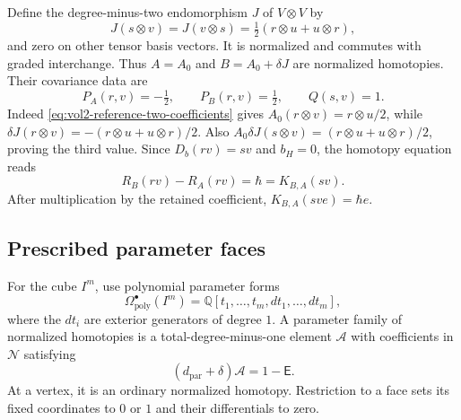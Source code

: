 Define the degree-minus-two endomorphism $J$ of
$V\otimes V$ by
\[
 J(s\otimes v)=J(v\otimes s)
                  =\tfrac12(r\otimes u+u\otimes r),
\]
and zero on other tensor basis vectors. It is normalized
and commutes with graded interchange. Thus
$A=A_0$ and $B=A_0+\delta J$ are normalized homotopies.
Their covariance data are
\begin{equation}\label{eq:vol2-choice-five-dimensional}
 P_A(r,v)=-\tfrac12,
 \qquad P_B(r,v)=\tfrac12,
 \qquad Q(s,v)=1.
\end{equation}
Indeed \eqref{eq:vol2-reference-two-coefficients} gives
$A_0(r\otimes v)=r\otimes u/2$, while
$\delta J(r\otimes v)=-(r\otimes u+u\otimes r)/2$.
Also $A_0\delta J(s\otimes v)
=(r\otimes u+u\otimes r)/2$, proving the third value.
Since $D_b(rv)=sv$ and $b_H=0$, the homotopy equation reads
\[
 R_B(rv)-R_A(rv)=\hbar=K_{B,A}(sv).
\]
After multiplication by the retained coefficient,
$K_{B,A}(sve)=\hbar e$.

\subsection{Prescribed parameter faces}

For the cube $I^m$, use polynomial parameter forms
\[
 \Omega_{\mathrm{poly}}^\bullet(I^m)
       =\mathbb Q[t_1,\ldots,t_m,dt_1,\ldots,dt_m],
\]
where the $dt_i$ are exterior generators of degree $1$.
A parameter family of normalized homotopies is a
total-degree-minus-one element $\mathcal A$ with
coefficients in $\mathcal N$ satisfying
\begin{equation}\label{eq:vol2-choice-total-equation}
 (d_{\mathrm{par}}+\delta)\mathcal A=1-\mathsf E.
\end{equation}
At a vertex, it is an ordinary normalized homotopy.
Restriction to a face sets its fixed coordinates to
$0$ or $1$ and their differentials to zero.

